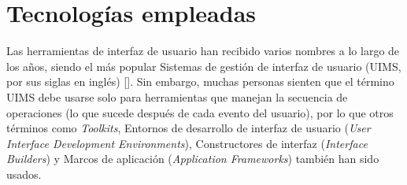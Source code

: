 %
%

\section{Tecnologías empleadas}

Las herramientas de interfaz de usuario han recibido varios nombres a lo largo de los años, siendo el más popular Sistemas de gestión de interfaz de usuario (UIMS, por sus siglas en inglés) [\cite{31}]. Sin embargo, muchas personas sienten que el término UIMS debe usarse solo para herramientas que manejan la secuencia de operaciones (lo que sucede después de cada evento del usuario), por lo que otros términos como \textit{Toolkits}, Entornos de desarrollo de interfaz de usuario (\textit{User Interface Development Environments}), Constructores de interfaz (\textit{Interface Builders}) y Marcos de aplicación (\textit{Application Frameworks}) también han sido usados.


